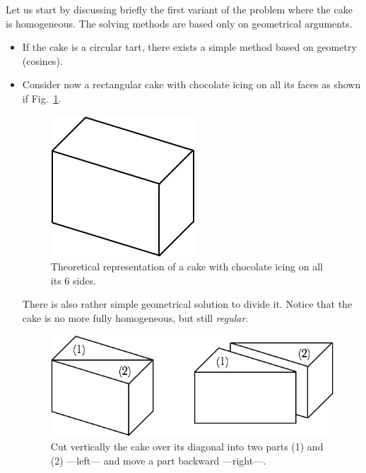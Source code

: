 Let us start by discussing briefly the first variant of the problem where the cake is homogeneous. 
The solving methods are based only on geometrical arguments. 
\begin{itemize}
\item If the cake is a circular tart, there exists a simple method based on geometry (cosines).
\item Consider now a rectangular cake with chocolate icing on all its faces as shown if Fig.~\ref{Fig:cakeHomogeneous1}.
\begin{figure}[htb]
\begin{center}
        \includegraphics[scale=0.4]{FiguresMaths/CakeHomogeneous1}
        \caption{Theoretical representation of a cake with chocolate icing on all its 6 sides.}
        \label{Fig:cakeHomogeneous1}
\end{center}
\end{figure}
There is also rather simple geometrical solution to divide it. 
Notice that the cake is no more fully homogeneous, but still \textit{regular}. 
\begin{figure}[htb]
\begin{center}
        \includegraphics[scale=0.4]{FiguresMaths/CakeHomogeneous2}
        \caption{Cut vertically the cake over its diagonal into two parts (1) and (2) ---left--- and move a part backward ---right---.}
        \label{Fig:cakeHomogeneous2}
\end{center}

\end{figure}
\end{itemize}
